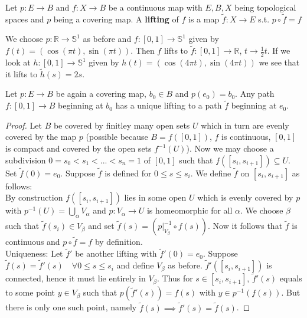 \begin{definition}\label{3.7}
    Let $p:E\to B$ and $f:X\to B$ be a continuous map with $E,B,X$ being topological spaces and $p$ being a covering map.
    A \textbf{lifting} of $f$ is a map $\tilde f:X\to E$ s.t. $p\circ \tilde f=f$
\end{definition}
\begin{example}\label{3.8}
    We choose $p:\mathbb{R}\to \mathbb{S}^1$ as before and $f:[0,1]\to \mathbb{S}^1$ given by $f(t)=(\cos(\pi t),\sin(\pi t))$. Then $f$ lifts to $\tilde f:[0,1]\to \mathbb{R}$, $t\to \frac{1}{2}t$.
    If we look at $h:[0,1]\to \mathbb{S}^1$ given by $h(t)=(\cos(4\pi t),\sin(4\pi t))$ we see that it lifts to $\tilde h(s)=2s$.
\end{example}
\begin{lemma}\label{3.9}
    Let $p:E\to B$ be again a covering map, $b_0\in B$ and $p(e_0)=b_0$.
    Any path $f:[0,1]\to B$ beginning at $b_0$ has a unique lifting to a path $\tilde f$ beginning at $e_0$.
\end{lemma}
\begin{proof}
    Let $B$ be covered by finitley many open sets $U$ which in turn are evenly covered by the map $p$ (possible because $B=f([0,1])$, $f$ is continuous, $[0,1]$ is compact and covered by the open sets $f^{-1}(U)$). Now we may choose a subdivision $0=s_0<s_1<...<s_n=1$ of $[0,1]$ such that $f([s_i,s_{i+1}])\subseteq U$.\\
    Set $\tilde f(0)=e_0$. Suppose $\tilde f$ is defined for $0\leq s\leq s_i$. We define $\tilde f$ on $[s_i,s_{i+1}]$ as follows:\\
    By construction $f([s_i,s_{i+1}])$ lies in some open $U$ which is evenly covered by $p$ with $p^{-1}(U)=\bigcup\limits_\alpha V_\alpha$ and $p:V_\alpha\to U$ is homeomorphic for all $\alpha$. We choose $\beta$ such that $\tilde f(s_i)\in V_\beta$ and set $\tilde f(s)=(p|_{V_\beta}^{-1}\circ f(s))$. Now it follows that $\tilde f$ is continuous and $p\circ \tilde f=f$ by definition.\\
    Uniqueness: Let $\tilde f'$ be another lifting with $\tilde f'(0)=e_0$. Suppose $\tilde f(s)=\tilde f'(s)\quad \forall 0\leq s\leq s_i$ and define $V_\beta$ as before.
    $\tilde f'([s_i,s_{i+1}])$ is connected, hence it must lie entirely in $V_\beta$. Thus for $s\in[s_i,s_{i+1}]$, $\tilde f'(s)$ equals to some point $y\in V_\beta$ such that $p(\tilde f'(s))=f(s)$ with $y\in p^{-1}(f(s))$. But there is only one such point, namely $\tilde f(s)\implies \tilde f'(s)=\tilde f(s)$.
\end{proof}

